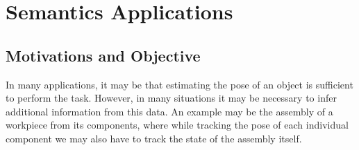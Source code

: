 \section{Semantics Applications}

\subsection{Motivations and Objective}

In many applications, it may be that estimating the pose of an object is sufficient to perform the task. However, in many situations it may be necessary to infer additional information from this data. An example may be the assembly of a workpiece from its components, where while tracking the pose of each individual component we may also have to track the state of the assembly itself.